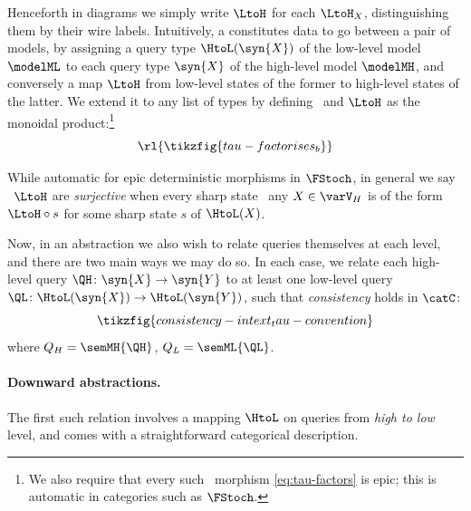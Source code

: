 \documentclass{article}
\begin{document}
Henceforth in diagrams we simply write $\LtoH$ for each $\LtoH_X$, distinguishing them by their wire labels. 
Intuitively, a \typedown{} constitutes data to go between a pair of models, by assigning a query type $\HtoL(\syn{X})$ of the low-level model $\modelML$ to each query type $\syn{X}$ of the high-level model $\modelMH$, and conversely a map $\LtoH$ from low-level states of the former to high-level states of the latter. 
We extend it to any list of types by defining \ and $\LtoH$ as the monoidal product:\footnote{We also require that every such \ morphism \eqref{eq:tau-factors} is epic; this is automatic in categories such as $\FStoch$. } 
\begin{equation} \label{eq:tau-factors}
\rl{\tikzfig{tau-factorises_b}}
\end{equation}

While automatic for epic deterministic morphisms in $\FStoch$, in general we say \ $\LtoH$ are \emph{surjective} when every sharp state \ any $X \in \varV_H$ is of the form $\LtoH \circ s$ for some sharp state $s$ of $\HtoL(X)$. 


Now, in an abstraction we also wish to relate queries themselves at each level, and there are two main ways we may do so. In each case, we relate each high-level query $\QH \colon \syn{X} \to \syn{Y}$ to at least one low-level query $\QL \colon \HtoL(\syn{X}) \to \HtoL(\syn{Y})$, such that \emph{consistency} holds in $\catC$:
\begin{equation} \label{eq:query-relation}
\tikzfig{consistency-intext_tau-convention} %
\end{equation}
where $Q_H = \semMH{\QH}$, $Q_L=\semML{\QL}$.

\paragraph{Downward abstractions.}
 The first such relation involves a mapping $\HtoL$ on queries from \emph{high to low} level, and comes with a straightforward categorical description. 
\end{document}
